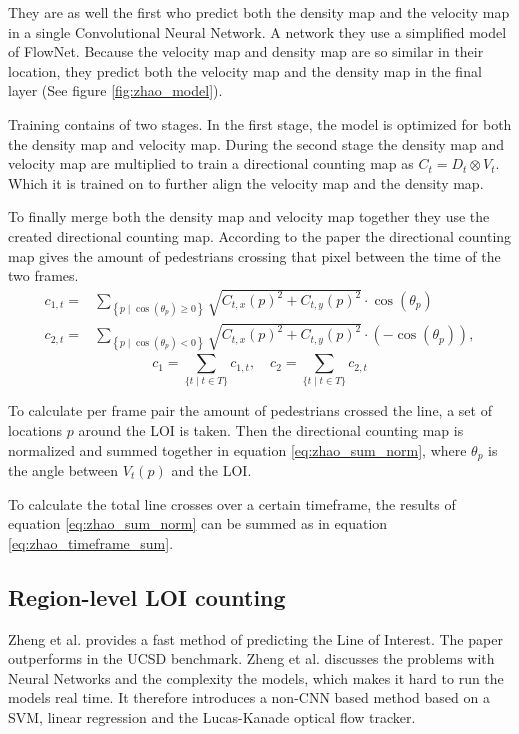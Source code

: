 They are as well the first who predict both the density map and the velocity map in a single Convolutional Neural Network. A network they use a  simplified model of FlowNet. Because the velocity map and density map are so similar in their location, they predict both the velocity map and the density map in the final layer (See figure \ref{fig:zhao_model}).

Training contains of two stages. In the first stage, the model is optimized for both the density map and velocity map. During the second stage the density map and velocity map are multiplied to train a directional counting map as $C_t=D_t \otimes V_t$. Which it is trained on to further align the velocity map and the density map. 

To finally merge both the density map and velocity map together they use the created directional counting map. According to the paper the directional counting map gives the amount of pedestrians crossing that pixel between the time of the two frames.
\begin{equation}
\begin{aligned}
c_{1, t} =& \sum_{\left\{p \mid \cos \left(\theta_{p}\right) \geq 0\right\}} \sqrt{C_{t, x}(p)^{2}+C_{t, y}(p)^{2}} \cdot \cos \left(\theta_{p}\right) \\
c_{2, t} =& \sum_{\left\{p \mid \cos \left(\theta_{p}\right)<0\right\}} \sqrt{C_{t, x}(p)^{2}+C_{t, y}(p)^{2}} \cdot\left(-\cos \left(\theta_{p}\right)\right),
\end{aligned}
\label{eq:zhao_sum_norm}
\end{equation}
\begin{equation}
c_{1}=\sum_{\{t \mid t \in T\}} c_{1, t}, \quad c_{2}=\sum_{\{t \mid t \in T\}} c_{2, t}
\label{eq:zhao_timeframe_sum}
\end{equation}

To calculate per frame pair the amount of pedestrians crossed the line, a set of locations $p$ around the LOI is taken. Then the directional counting map is normalized and summed together in equation \ref{eq:zhao_sum_norm}, where $\theta_p$ is the angle between $V_t(p)$ and the LOI.

To calculate the total line crosses over a certain timeframe, the results of equation \ref{eq:zhao_sum_norm} can be summed as in equation \ref{eq:zhao_timeframe_sum}.


\subsection{Region-level LOI counting}
Zheng et al. \cite{zheng_cross-line_2019} provides a fast method of predicting the Line of Interest. The paper outperforms \cite{leibe_crossing-line_2016} in the UCSD benchmark. Zheng et al. discusses the problems with Neural Networks and the complexity the models, which makes it hard to run the models real time. It therefore introduces a non-CNN based method based on a SVM, linear regression and the Lucas-Kanade optical flow tracker.

